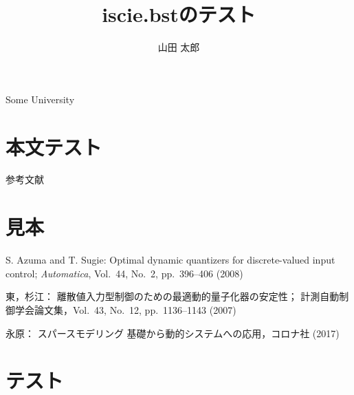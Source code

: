 \documentclass[J,amsmath]{scitrans}
\begin{document}
  \title{iscie.bstのテスト}
  \author{山田 太郎}

  \address{*}{\AcceptDate}
  \address{**}{Some University}

  \section*{本文テスト}
    参考文献\cite{azuma2008optimal,東俊一2007離散値入力型制御のための最適動的量子化器の安定性,永原正章2017-10-06}

  \section*{見本}
    \begin{thebibliography}{9}
      S. Azuma and T. Sugie:
      Optimal dynamic quantizers for discrete-valued input control;
      {\it Automatica}, Vol.~44, No.~2, pp.~396--406 (2008)

      東，杉江：
      離散値入力型制御のための最適動的量子化器の安定性；
      計測自動制御学会論文集，Vol.~43, No.~12, pp.~1136--1143 (2007)

      永原：
      スパースモデリング 基礎から動的システムへの応用，コロナ社 (2017)


    \end{thebibliography}

  \section*{テスト}
    
    
\end{document}

